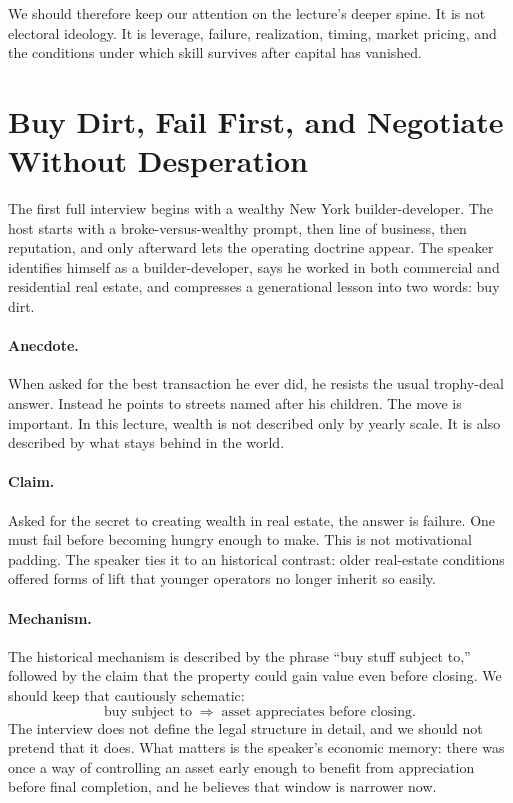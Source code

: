 We should therefore keep our attention on the lecture's deeper spine. It is not electoral ideology. It is leverage, failure, realization, timing, market pricing, and the conditions under which skill survives after capital has vanished.

\section{Buy Dirt, Fail First, and Negotiate Without Desperation}

The first full interview begins with a wealthy New York builder-developer. The host starts with a broke-versus-wealthy prompt, then line of business, then reputation, and only afterward lets the operating doctrine appear. The speaker identifies himself as a builder-developer, says he worked in both commercial and residential real estate, and compresses a generational lesson into two words: buy dirt.

\paragraph{Anecdote.}
When asked for the best transaction he ever did, he resists the usual trophy-deal answer. Instead he points to streets named after his children. The move is important. In this lecture, wealth is not described only by yearly scale. It is also described by what stays behind in the world.

\paragraph{Claim.}
Asked for the secret to creating wealth in real estate, the answer is failure. One must fail before becoming hungry enough to make. This is not motivational padding. The speaker ties it to an historical contrast: older real-estate conditions offered forms of lift that younger operators no longer inherit so easily.

\paragraph{Mechanism.}
The historical mechanism is described by the phrase ``buy stuff subject to,'' followed by the claim that the property could gain value even before closing. We should keep that cautiously schematic:
\begin{equation}
\text{buy subject to} \;\Rightarrow\; \text{asset appreciates before closing}.
\end{equation}
The interview does not define the legal structure in detail, and we should not pretend that it does. What matters is the speaker's economic memory: there was once a way of controlling an asset early enough to benefit from appreciation before final completion, and he believes that window is narrower now.

